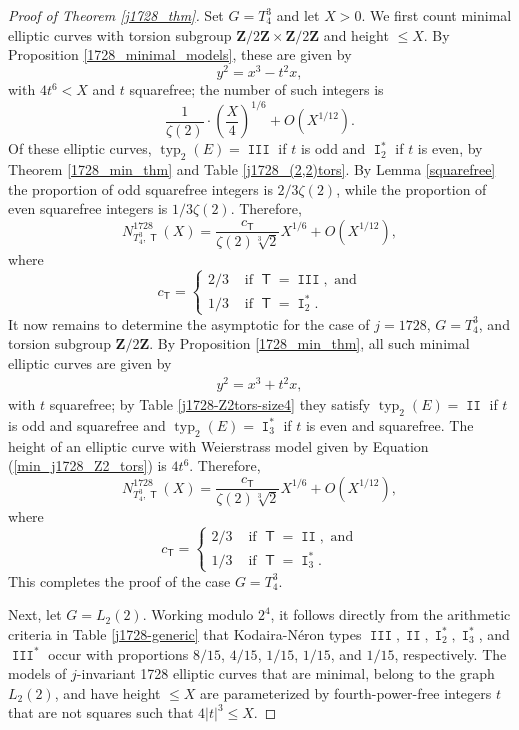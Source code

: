 \documentclass[10pt,a4paper]{amsart}
\DeclareMathOperator{\I}{\mathtt{I}}
\DeclareMathOperator{\II}{\mathtt{II}}
\DeclareMathOperator{\III}{\mathtt{III}}
\newcommand{\T}{\operatorname{\mathsf{T}}}
\newcommand{\Z}{\mathbf{Z}}
\DeclareMathOperator{\typ}{{typ}}
\begin{document}
\begin{proof}[Proof of Theorem \ref{j1728_thm}]
Set $G = T_4^3$ and let $X >0$.  We first count minimal elliptic curves with torsion subgroup $\Z/2\Z \times \Z/2\Z$ and height $\leq X$.  By  Proposition \ref{1728_minimal_models}, these are given by 
\[
y^2 = x^3 -t^2 x,
\]
with $4t^6 <X$ and $t$ squarefree; the number of such integers is 
\[
\frac{1}{\zeta(2)} \cdot \left(\frac{X}{4}\right)^{1/6} + O(X^{1/12}).
\]
Of these elliptic curves, $\typ_2(E) = \III$ if $t$ is odd and $\I_2^*$ if $t$ is even, by Theorem \ref{1728_min_thm} and Table \ref{j1728_(2,2)tors}.  By Lemma \ref{squarefree} the proportion of odd squarefree integers is $2/3\zeta(2)$, while the proportion of even squarefree integers is $1/3\zeta(2)$.  Therefore, 
\[
N_{T_4^3,\T}^{1728}(X) =\frac{c_{\T}}{\zeta(2)\sqrt[3]{2}}X^{1/6} + O(X^{1/12}),
\]
where
\[
c_{\T} = \begin{cases} 2/3 & \text{ if } \T =   \III, \text{ and} \\
1/3 & \text{ if } \T = \I_2^*. \end{cases}
\]
It now remains to determine the asymptotic for the case of $j=1728$, $G = T_4^3$, and torsion subgroup $\Z/2\Z$.  By Proposition \ref{1728_min_thm}, all such minimal elliptic curves are given by 
\begin{align} \label{min_j1728_Z2_tors}
y^2 = x^3 + t^2x,
\end{align}
with $t$ squarefree; by Table  \ref{j1728-Z2tors-size4} they satisfy $\typ_2(E) = \II$ if $t$ is odd and squarefree and $\typ_2(E) = \I_3^*$ if $t$ is even and squarefree.   The height of an elliptic curve with Weierstrass model given by Equation (\ref{min_j1728_Z2_tors}) is $4t^6$.  Therefore, 
\[
N_{T_4^3,\T}^{1728}(X) =\frac{c_{\T}}{\zeta(2)\sqrt[3]{2}}X^{1/6} + O(X^{1/12}),
\]
where
\[
c_{\T} = \begin{cases} 2/3 & \text{ if } \T =   \II, \text{ and} \\
1/3 & \text{ if } \T = \I_3^*. \end{cases}
\]
This completes the proof of the case $G= T_4^3$.  

Next, let $G = L_2(2)$.  Working modulo $2^4$, it follows directly from the arithmetic criteria in Table \ref{j1728-generic} that Kodaira-N\'eron types $\III, \II, \I_2^*, \I_3^*$, and $\III^*$ occur with proportions $8/15$, $4/15$, $1/15$, $1/15$, and $1/15$, respectively.  The models of $j$-invariant 1728 elliptic curves that are minimal,  belong to the graph $L_2(2)$, and have height $\leq X$  are parameterized by fourth-power-free integers $t$ that are not squares such that $4|t|^3\leq X$.


\end{proof}
\end{document}

